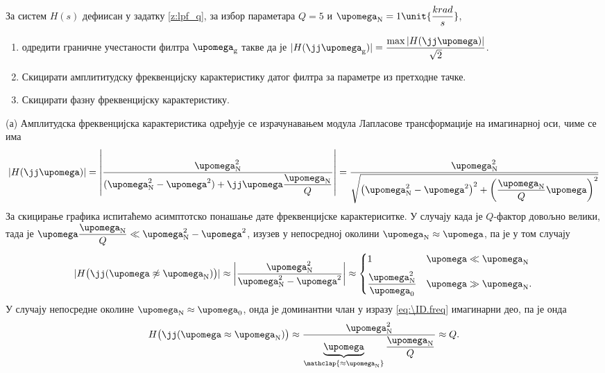 \PID \mnImportant
За систем $H(s)$ дефиисан у задатку \ref{z:lpf_q}, за избор параметара 
$Q = 5$ и $\upomega_{\rm N} = 1\unit{\dfrac{krad}{s}}$,
\begin{enumerate}[label=(\alph*)]
    \item одредити граничне учестаности филтра $\upomega_{\rm g}$ такве да је
    $|H(\jj\upomega_{\rm g})| = \dfrac{\max|H(\jj\upomega)|}{\sqrt 2}$.
    \item Скицирати амплититудску фреквенцијску карактеристику датог филтра за параметре из претходне тачке. 
    \item Скицирати фазну фреквенцијску карактеристику. 
\end{enumerate}

\RESENJE 
(а) Амплитудска фреквенцијска карактеристика одређује се израчунавањем модула Лапласове трансформације 
на имагинарној оси, чиме се има 
\begin{equation}
    |H(\jj\upomega)| =
    \left|
    \dfrac{\upomega_{\rm N}^2 }{(\upomega_{\rm N}^2 - \upomega^2) + \jj\upomega\dfrac{\upomega_{\rm N}}{Q}} 
    \right| 
    =
    \dfrac{\upomega_{\rm N}^2}{\sqrt{  
        \left(\upomega_{\rm N}^2 - \upomega^2\right)^2 
        +
        \left(
            \dfrac{\upomega_{\rm N}}{Q} \upomega
        \right)^2
    }}
    \label{eq:\ID.freq}
\end{equation}
За скицирање графика испитаћемо асимптотско понашање дате фреквенцијске карактериситке. 
У случају када је $Q$-фактор довољно велики, тада је 
$\upomega\dfrac{\upomega_{\rm N}}{Q} \ll \upomega_{\rm N}^2 - \upomega^2$, изузев у непосредној околини 
$\upomega_{\rm N} \approx \upomega$, па је у том случају
\begin{equation}
    | H \bigl( \jj(\upomega \not \approx \upomega_{\rm N}) \bigr) |\approx
    \left|
    \dfrac{\upomega_{\rm N}^2}{\upomega_{\rm N}^2 - \upomega^2}
    \right|
    \approx \begin{cases}
        1 & \upomega \ll \upomega_{\rm N} \\[2mm]
        \dfrac{\upomega_{\rm N}^2}{\upomega_0} & \upomega \gg \upomega_{\rm N}.
    \end{cases}
\end{equation} 
У случају непосредне околине $\upomega_{\rm N}\approx \upomega_{0}$, онда је доминантни члан у изразу
\ref{eq:\ID.freq} имагинарни део, па је онда 
\begin{equation}
    H \bigl( \jj(\upomega \approx \upomega_{\rm N}) \bigr) \approx 
    \dfrac{\upomega_{\rm N}^2}{\underbrace{\upomega}_{\mathclap{\approx \upomega_{\rm N}}}\dfrac{\upomega_{\rm N}}{Q} }
    \approx Q.
\end{equation}
